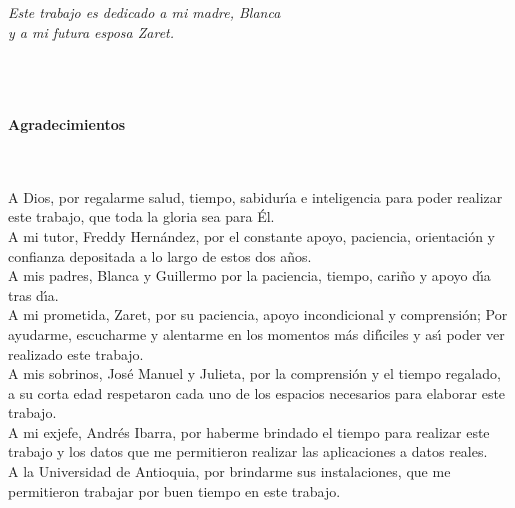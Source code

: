 \begin{flushright}
\begin{minipage}{12cm}
    \noindent
        \small
				\textsl{Este trabajo es dedicado a mi madre, Blanca\\
				y a mi futura esposa Zaret.}\\
\end{minipage}
\end{flushright}

\newpage{\pagestyle{empty}\cleardoublepage}

\newpage
\thispagestyle{empty} \textbf{}\normalsize
\\\\\\%
\textbf{\LARGE Agradecimientos}
\\\\

A Dios, por regalarme salud, tiempo, sabidur\'{\i}a e inteligencia para poder realizar este trabajo, que toda la gloria sea para \'{E}l.\\

A mi tutor, Freddy Hern\'{a}ndez, por el constante apoyo, paciencia, orientaci\'{o}n y confianza depositada a lo largo de estos dos a\~{n}os.\\

A mis padres, Blanca y Guillermo por la paciencia, tiempo, cari\~{n}o y apoyo d\'{\i}a tras d\'{\i}a.\\

A mi prometida, Zaret, por su paciencia, apoyo incondicional y comprensi\'{o}n; Por ayudarme, escucharme y alentarme en los momentos m\'{a}s dif\'{\i}ciles y as\'{\i} poder ver realizado este trabajo.\\

A mis sobrinos, Jos\'{e} Manuel y Julieta, por la comprensi\'{o}n y el tiempo regalado, a su corta edad respetaron cada uno de los espacios necesarios para elaborar este trabajo.\\

A mi exjefe, Andr\'{e}s Ibarra, por haberme brindado el tiempo para realizar este trabajo y los datos que me permitieron realizar las aplicaciones a datos reales.\\

A la Universidad de Antioquia, por brindarme sus instalaciones, que me permitieron trabajar por buen tiempo en este trabajo. 

\newpage{\pagestyle{empty}\cleardoublepage}


